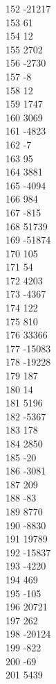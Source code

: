 { 152	-21217 \\
 153	61 \\
 154	12 \\
 155	2702 \\
 156	-2730 \\
 157	-8 \\
 158	12 \\
 159	1747 \\
 160	3069 \\
 161	-4823 \\
 162	-7 \\
 163	95 \\
 164	3881 \\
 165	-4094 \\
 166	984 \\
 167	-815 \\
 168	51739 \\
 169	-51874 \\
 170	105 \\
 171	54 \\
 172	4203 \\
 173	-4367 \\
 174	122 \\
 175	810 \\
 176	33366 \\
 177	-15083 \\
 178	-19228 \\
 179	187 \\
 180	14 \\
 181	5196 \\
 182	-5367 \\
 183	178 \\
 184	2850 \\
 185	-20 \\
 186	-3081 \\
 187	209 \\
 188	-83 \\
 189	8770 \\
 190	-8830 \\
 191	19789 \\
 192	-15837 \\
 193	-4220 \\
 194	469 \\
 195	-105 \\
 196	20721 \\
 197	262 \\
 198	-20124 \\
 199	-822 \\
 200	-69 \\
 201	5439 \\
}

